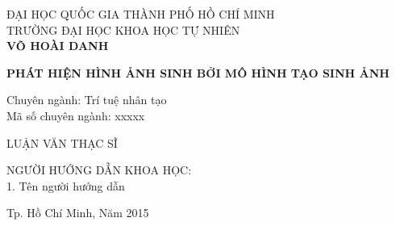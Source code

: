 \begin{titlepage}
\begin{center}
ĐẠI HỌC QUỐC GIA THÀNH PHỐ HỒ CHÍ MINH\\
TRƯỜNG ĐẠI HỌC KHOA HỌC TỰ NHIÊN\\[2cm]

{ \LARGE \bfseries VÕ HOÀI DANH\\[1cm] } 

{ \huge \bfseries PHÁT HIỆN HÌNH ẢNH SINH BỞI MÔ HÌNH TẠO SINH ẢNH\\[2cm] } 

\begin{flushleft} \large
Chuyên ngành: Trí tuệ nhân tạo\\
Mã số chuyên ngành: xxxxx\\[2cm]
\end{flushleft}

\large LUẬN VĂN THẠC SĨ\\[2cm]


\begin{flushright} \large
NGƯỜI HƯỚNG DẪN KHOA HỌC:\\
1. Tên người hướng dẫn
\end{flushright}


\vfill
Tp. Hồ Chí Minh, Năm 2015

\end{center}

\end{titlepage}
